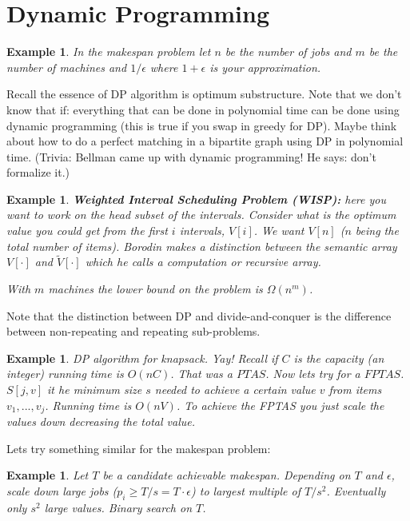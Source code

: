 \documentclass[twoside]{article}
\newtheorem{example}[theorem]{Example}
\begin{document}
\section{Dynamic Programming}
\begin{example}
In the makespan problem let $n$ be the number of jobs and $m$ be the number of machines and $1/\epsilon$ where $1 + \epsilon$ is your approximation.
\end{example}

Recall the essence of DP algorithm is optimum substructure. Note that we don't know that if: everything that can be done in polynomial time can be done using dynamic programming (this is true if you swap in greedy for DP). Maybe think about how to do a perfect matching in a bipartite graph using DP in polynomial time. (Trivia: Bellman came up with dynamic programming! He says: don't formalize it.)

\begin{example}
\textbf{Weighted Interval Scheduling Problem (WISP):} here you want to work on the head subset of the intervals. Consider what is the optimum value you could get from the first $i$ intervals, $V[i]$. We want $V[n]$ ($n$ being the total number of items). Borodin makes a distinction between the semantic array $V[\cdot]$ and $\tilde{V}[\cdot]$ which he calls a \emph{computation or recursive array}. 

With $m$ machines the lower bound on the problem is $\Omega(n^m)$. 
\end{example}

Note that the distinction between DP and divide-and-conquer is the difference between non-repeating and repeating sub-problems.  
\begin{example}
DP algorithm for knapsack. Yay! Recall if $C$ is the capacity (an integer) running time is $O(nC)$. That was a $PTAS$. Now lets try for a $FPTAS$. $S[j, v]$ it he minimum size $s$ needed to achieve a certain value $v$ from items $v_1, ..., v_j$. Running time is $O(nV)$. To achieve the FPTAS you just scale the values down decreasing the total value. 
\end{example}

Lets try something similar for the makespan problem:
\begin{example}
Let $T$ be a candidate achievable makespan. Depending on $T$ and $\epsilon$, scale down large jobs ($p_i\geq T/s = T\cdot \epsilon$) to largest multiple of $T/s^2$. Eventually only $s^2$ large values. Binary search on $T$.
\end{example}
\end{document}
